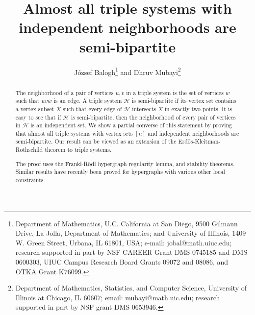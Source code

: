 \documentclass[11pt]{article}
\newcommand{\C}[1]{{\protect\cal #1}}
\begin{document}
 \usepackage{./extract}
\newtheorem{theorem}{Theorem}
\newtheorem{corollary}[theorem]{Corollary}
\newtheorem{lemma}[theorem]{Lemma}
\newtheorem{claim}[theorem]{Claim}
\newtheorem{proposition}[theorem]{Proposition}
\newtheorem{conjecture}[theorem]{Conjecture}
\newcommand\eps{\varepsilon}

\newcommand{\brac}[1]{\left(#1\right)}
\newcommand{\bfrac}[2]{\brac{\frac{#1}{#2}}}
\newcommand{\rdown}[1]{\left\lfloor#1\right\rfloor}
\newcommand{\rdup}[1]{\left\lceil#1\right\rceil}
\newcommand{\me}{\mathrm{e}}
\newcommand{\ee}{\epsilon}
\newcommand{\ex}{\mathrm{ex}}
\newcommand{\Bin}{\mathrm{Bin}}
\newcommand{\cG}{{{\cal G}}}
\newcommand{\cK}{{\cal K}}
\newcommand{\cH}{{\cal H}}
\newcommand{\cP}{{\cal P}}
\newcommand{\cJ}{{\cal J}}
\newcommand{\cE}{{\cal E}}
\newcommand{\cB}{{\cal B}}
\newcommand{\cM}{{\cal M}}
\def\Q{\mathcal{Q}}
\def\C{\mathcal{C}}
\newtheorem{definition}[theorem]{Definition}
\def\FF{\mathcal{F}}
\def\NN{\mathcal{N}}
\def\F{\mathcal{F}}
\def\S{\mathcal{S}}
\def\SS{\mathcal{S}}
\def\eps{\varepsilon}
\newcommand{\eee}{{\mathbb E}}
\def\HH{\mathcal{H}}
\parindent=0pt

\title{Almost all triple systems with independent neighborhoods
are semi-bipartite}


\author{J\'ozsef Balogh\thanks{{Department of
Mathematics, U.C. California at San Diego, 9500 Gilmann Drive, La
Jolla, Department of Mathematics; and  University of Illinois, 1409
W. Green Street, Urbana, IL 61801, USA}; e-mail:
{jobal@math.uiuc.edu;} research  supported in part   by NSF CAREER
Grant DMS-0745185 and DMS-0600303, UIUC Campus Research Board Grants
09072 and 08086, and OTKA Grant K76099.}  \quad  and \quad Dhruv
Mubayi\thanks{Department of Mathematics, Statistics, and Computer
Science, University of Illinois at Chicago, IL 60607;  email:
mubayi@math.uic.edu; research  supported in part by  NSF grant DMS
0653946.}}

\maketitle

\vspace{-0.4in}

\begin{abstract}
The neighborhood of a pair of vertices $u,v$ in a triple system is the set of vertices $w$ such that $uvw$ is an edge.
 A triple system
 $\HH$ is semi-bipartite if its vertex set
contains a vertex subset $X$ such that every edge of $\HH$
intersects $X$ in exactly two points. It is easy to see that if
$\HH$ is semi-bipartite, then the neighborhood of every pair of
vertices in $\HH$  is an independent set. We show a partial converse
of this statement by proving that almost all triple systems with
 vertex sets $[n]$ and independent neighborhoods are semi-bipartite. Our result can be
viewed as an extension
 of the Erd\H os-Kleitman-Rothschild theorem to triple systems.


The proof uses the Frankl-R\"odl hypergraph regularity lemma, and stability
theorems. Similar results have recently been proved for hypergraphs with various other local constraints.
\end{abstract}
\end{document}
